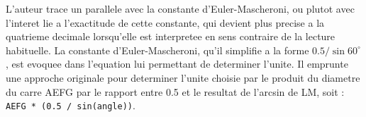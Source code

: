 \documentclass[12pt,a4paper]{article}
\theoremstyle{definition}
\theoremstyle{remark}
\begin{document}
L'auteur trace un parallele avec la constante d'Euler-Mascheroni,
ou plutot avec l'interet lie a l'exactitude de cette constante,
qui devient plus precise a la quatrieme decimale lorsqu'elle est interpretee
en sens contraire de la lecture habituelle.
La constante d'Euler-Mascheroni, qu'il simplifie a la forme
\(0.5 / \sin 60^\circ\), est evoquee dans l'equation lui permettant
de determiner l'unite. Il emprunte une approche originale pour determiner
l'unite choisie par le produit du diametre du carre AEFG
par le rapport entre 0.5 et le resultat de l'arcsin de LM,
soit : \texttt{AEFG * (0.5 / sin(angle))}.

\vspace{0.8cm}

\end{document}

